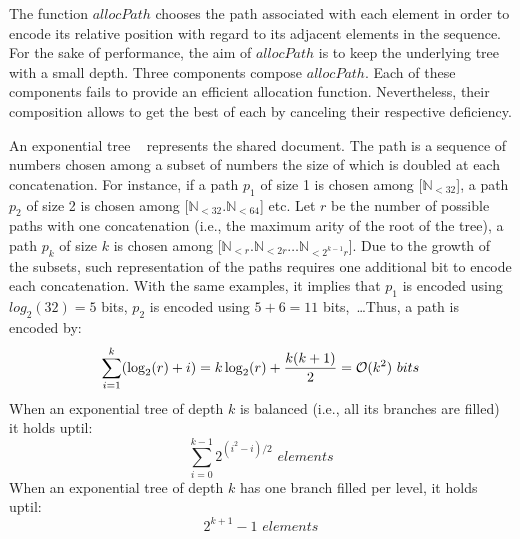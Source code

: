The function $allocPath$ chooses the path associated with each element in order
to encode its relative position with regard to its adjacent elements in the
sequence. For the sake of performance, the aim of $allocPath$ is to keep the
underlying tree with a small depth. Three components compose $allocPath$. Each
of these components fails to provide an efficient allocation
function. Nevertheless, their composition allows to get the best of each by
canceling their respective deficiency.
\begin{asparadesc}
\item [An exponential tree]~\cite{andersson1996faster,andersson2007dynamic}
  represents the shared document. The path is a sequence of numbers chosen among
  a subset of numbers the size of which is doubled at each concatenation. For
  instance, if a path $p_1$ of size 1 is chosen among [$\mathbb{N}_{<32}$], a
  path $p_2$ of size 2 is chosen among [$\mathbb{N}_{<32}.\mathbb{N}_{<64}$]
  etc. Let $r$ be the number of possible paths with one concatenation (i.e., the
  maximum arity of the root of the tree), a path $p_k$ of size $k$ is chosen
  among [$\mathbb{N}_{<r}.\mathbb{N}_{<2r}\ldots\mathbb{N}_{<2^{k-1}r}$].  Due
  to the growth of the subsets, such representation of the paths requires one
  additional bit to encode each concatenation. With the same examples, it
  implies that $p_1$ is encoded using $log_2(32)=5$ bits, $p_2$ is encoded using
  $5+6=11$ bits,~\ldots Thus, a path is encoded by:
  \begin{equation}
    \sum\limits_{i=1}^{k}(\log_2(r)+i) =
    k\log_2(r) + {k(k+1)\over{2}} = \mathcal{O}(k^2) \,\, bits
  \end{equation}
  When an exponential tree of depth $k$ is balanced (i.e., all its branches
  are filled) it holds uptil:
  \begin{equation} \sum\limits_{i=0}^{k-1} {2^{(i^2-i)/2}} \,\, elements
  \end{equation}
  When an exponential tree of depth $k$ has one branch filled per level, it
  holds uptil:
  \begin{equation} 2^{k+1}-1 \,\, elements\end{equation}
  

\end{asparadesc}
